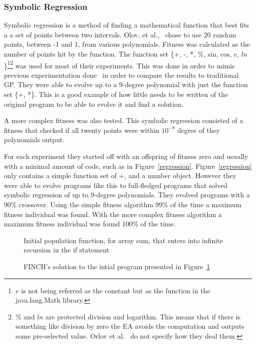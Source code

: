 \documentclass{sig-alternate}
\begin{document}
\subsubsection{Symbolic Regression}
Symbolic regression is a method of finding a mathematical function that best fits a a set of points between two intervals. Olov, et al.,~\cite{FINCH:2011} chose to use 20 random points, between -1 and 1, from various polynomials. Fitness was calculated as the number of points hit by the function. The function set \{+, -, *, \%, sin, cos, $e$, $ln$\}\footnote{$e$ is not being referred as the constant but as the function in the java.lang.Math library.}\footnote{\% and $ln$ are protected division and logarithm. This means that if there is something like division by zero the EA avoids the computation and outputs some pre-selected value. Orlov et al.~\cite{FINCH:2011} do not specify how they deal them.} was used for most of their experiments. This was done in order to mimic previous experimentation done~\cite{koza:1992} in order to compare the results to traditional GP. They were able to evolve up to a 9-degree polynomial with just the function set \{+, *\}. This is a good example of how little needs to be written of the original program to be able to evolve it and find a solution.

A more complex fitness was also tested. This symbolic regression consisted of a fitness that checked if all twenty points were within $10^{-8}$ degree of they polynomials output. 

For each experiment they started off with an offspring of fitness zero and usually with a minimal amount of code, such as in Figure~\ref{regression}. Figure~\ref{regression} only contains a simple function set of {+, \*} and a number object. However they were able to evolve programs like this to full-fledged programs that solved symbolic regression of up to 9-degree polynomials. 
They evolved programs with a 90\% crossover. Using the simple fitness algorithm 99\% of the time a maximum fitness individual was found. With the more complex fitness algorithm a maximum fitness individual was found 100\% of the time.

\begin{figure}
\centering
{}
\caption{Initial population function, for array sum, that enters into infinite recursion in the if statement}
\label{initial rec}
\end{figure}

\begin{figure}
\centering
{}
\caption{FINCH's solution to the intial program presented in Figure~\ref{initial rec}}
\end{figure}
\end{document}
